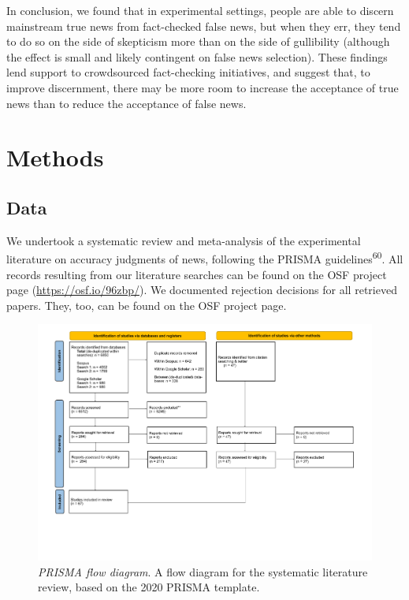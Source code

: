 \documentclass[
  man]{apa6}
\begin{document}
In conclusion, we found that in experimental settings, people are able to discern mainstream true news from fact-checked false news, but when they err, they tend to do so on the side of skepticism more than on the side of gullibility (although the effect is small and likely contingent on false news selection). These findings lend support to crowdsourced fact-checking initiatives, and suggest that, to improve discernment, there may be more room to increase the acceptance of true news than to reduce the acceptance of false news.

\section{Methods}\label{methods}

\subsection{Data}\label{data}

We undertook a systematic review and meta-analysis of the experimental literature on accuracy judgments of news, following the PRISMA guidelines\textsuperscript{60}. All records resulting from our literature searches can be found on the OSF project page (\url{https://osf.io/96zbp/}). We documented rejection decisions for all retrieved papers. They, too, can be found on the OSF project page.



\begin{figure}
\centering
\includegraphics{literature_search/PRISMA_2020_flow_diagram.pdf}
\caption{\label{fig:prisma-flowchart}\emph{PRISMA flow diagram}. A flow diagram for the systematic literature review, based on the 2020 PRISMA template.}
\end{figure}
\end{document}
